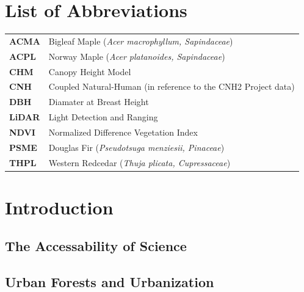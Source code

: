 \documentclass[12pt,twoside]{reedthesis}
\begin{document}
\hypertarget{list-of-abbreviations}{%
\chapter*{List of Abbreviations}\label{list-of-abbreviations}}
\begin{table}[h]\large
    \centering %
    \begin{tabular}{ll}
        \textbf{ACMA}   &  Bigleaf Maple (\textit{Acer macrophyllum, Sapindaceae})  \\
        \textbf{ACPL}   &  Norway Maple (\textit{Acer platanoides, Sapindaceae}) \\
        \textbf{CHM}    &  Canopy Height Model \\
        \textbf{CNH}    &  Coupled Natural-Human (in reference to the CNH2 Project data)\\
        \textbf{DBH}    &  Diamater at Breast Height\\
        \textbf{LiDAR}  &  Light Detection and Ranging\\
        \textbf{NDVI}   &  Normalized Difference Vegetation Index \\
        \textbf{PSME}   &  Douglas Fir (\textit{Pseudotsuga menziesii, Pinaceae}) \\
        \textbf{THPL}   &  Western Redcedar (\textit{Thuja plicata, Cupressaceae}) \\
    \end{tabular}
\end{table}
\hypertarget{intro}{%
\chapter{Introduction}\label{intro}}

\hypertarget{the-accessability-of-science}{%
\section{The Accessability of Science}\label{the-accessability-of-science}}

\hypertarget{urban-forests-and-urbanization}{%
\section{Urban Forests and Urbanization}\label{urban-forests-and-urbanization}}
\end{document}
